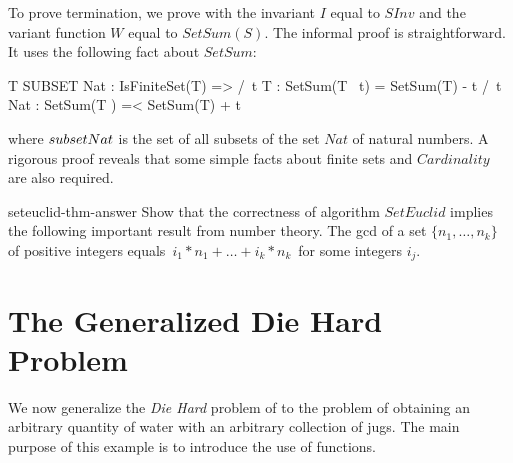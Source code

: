 \documentclass[fleqn,leqno]{article}
\begin{document}
To prove termination, we prove
with the invariant $I$ equal to $SInv$ and the variant function
$W$ equal to $SetSum(S)$.  The informal proof is straightforward.
It uses the following fact about $SetSum$:
\begin{display}
\begin{notla}
\A T \in SUBSET Nat : 
    IsFiniteSet(T) => /\ \A t \in T : SetSum(T \ {t}) = SetSum(T) - t 
                      /\ \A t \in Nat : SetSum(T ) =< SetSum(T) + t 
\end{notla}
\begin{tlatex}
%
\end{tlatex}
\end{display}
where 
$\SUBSET Nat$ is the set of all subsets of the set $Nat$ of natural
numbers.  A rigorous proof reveals that some simple facts about finite
sets and $Cardinality$ are also required.

\begin{aquestion}{seteuclid-thm-answer} 
Show that the correctness of algorithm $SetEuclid$ implies the
following important result from number theory.  The gcd of a set
$\{n_{1}, \ldots, n_{k}\}$ of positive integers equals
 $\, i_{1}*n_{1} + \ldots + i_{k}*n_{k} \,$
for some integers $i_{j}$.
\end{aquestion}

\bigskip
\noindent
{}



\newpage
\vspace*{-\baselineskip}

\section{The Generalized Die Hard Problem}  

We now generalize the \emph{Die Hard} problem of 
to the problem of obtaining an arbitrary quantity of water with an
arbitrary collection of jugs.  The main purpose of this example is to
introduce the use of functions.
\end{document}
